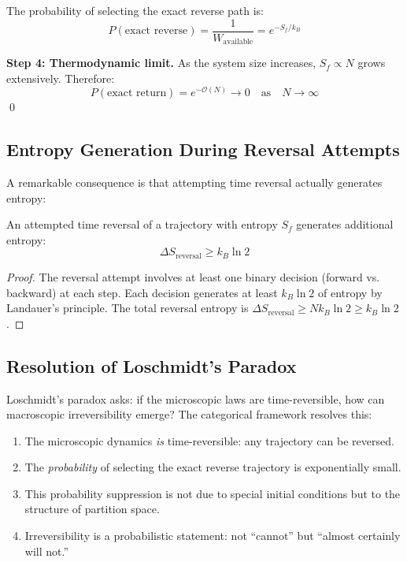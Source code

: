The probability of selecting the exact reverse path is:
\begin{equation}
    P(\text{exact reverse}) = \frac{1}{W_{\text{available}}} = e^{-S_f/k_B}
\end{equation}

\textbf{Step 4: Thermodynamic limit.}
As the system size increases, $S_f \propto N$ grows extensively. Therefore:
\begin{equation}
    P(\text{exact return}) = e^{-\mathcal{O}(N)} \to 0 \quad \text{as} \quad N \to \infty
\end{equation}
\qed

\subsection{Entropy Generation During Reversal Attempts}

A remarkable consequence is that attempting time reversal actually generates entropy:

\begin{proposition}
An attempted time reversal of a trajectory with entropy $S_f$ generates additional entropy:
\begin{equation}
    \Delta S_{\text{reversal}} \geq k_B \ln 2
\end{equation}
\end{proposition}

\begin{proof}
The reversal attempt involves at least one binary decision (forward vs. backward) at each step. Each decision generates at least $k_B \ln 2$ of entropy by Landauer's principle. The total reversal entropy is $\Delta S_{\text{reversal}} \geq N k_B \ln 2 \geq k_B \ln 2$.
\end{proof}

\subsection{Resolution of Loschmidt's Paradox}

Loschmidt's paradox asks: if the microscopic laws are time-reversible, how can macroscopic irreversibility emerge? The categorical framework resolves this:

\begin{enumerate}
    \item The microscopic dynamics \textit{is} time-reversible: any trajectory can be reversed.
    \item The \textit{probability} of selecting the exact reverse trajectory is exponentially small.
    \item This probability suppression is not due to special initial conditions but to the structure of partition space.
    \item Irreversibility is a probabilistic statement: not ``cannot'' but ``almost certainly will not.''
\end{enumerate}

